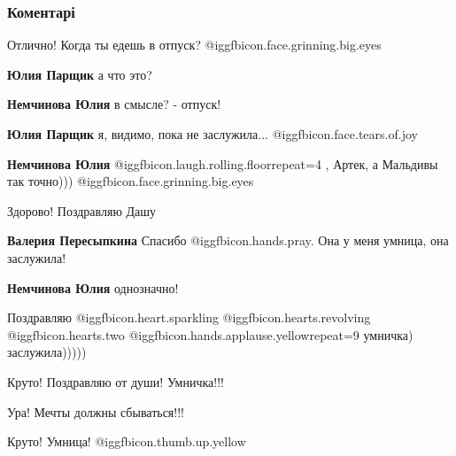  
 
 
 
 
\subsubsection{Коментарі}
\label{sec:19_10_2021.fb.nemchinova_julia.belgorod.1.dasha_edet_v_artek.cmt}

\begin{itemize} %
Отлично! Когда ты едешь в отпуск? @igg{fbicon.face.grinning.big.eyes} 

\begin{itemize} %
\textbf{Юлия Парщик} а что это?

\textbf{Немчинова Юлия} в смысле? - отпуск!

\textbf{Юлия Парщик} я, видимо, пока не заслужила...  @igg{fbicon.face.tears.of.joy} 

\textbf{Немчинова Юлия}  @igg{fbicon.laugh.rolling.floor}{repeat=4} , Артек, а Мальдивы так точно))) @igg{fbicon.face.grinning.big.eyes} 
\end{itemize} %

Здорово! Поздравляю Дашу

\begin{itemize} %
\textbf{Валерия Пересыпкина} Спасибо  @igg{fbicon.hands.pray}. Она у меня умница, она заслужила!

\textbf{Немчинова Юлия} однозначно!
\end{itemize} %

Поздравляю  @igg{fbicon.heart.sparkling}  @igg{fbicon.hearts.revolving}  @igg{fbicon.hearts.two}  @igg{fbicon.hands.applause.yellow}{repeat=9} умничка) заслужила)))))

Круто! Поздравляю от души! Умничка!!!

Ура! Мечты должны сбываться!!!

Круто! Умница! @igg{fbicon.thumb.up.yellow} 


\end{itemize}
